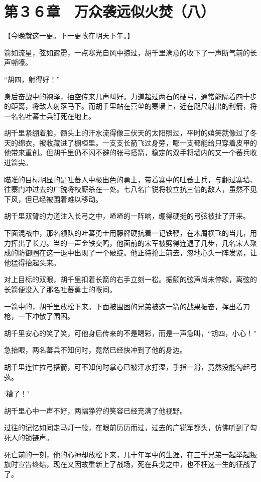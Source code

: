 \section{第３６章　万众袭远似火焚（八）}

【今晚就这一更。下一更改在明天下午。】

箭如流星，弦如霹雳，一点寒光自风中掠过，胡千里满意的收下了一声断气前的长声嘶嚎。

“胡四，射得好！”

身后奋战中的袍泽，抽空传来几声叫好。力道超过两石的硬弓，通常能隔着四十步的距离，将敌人射落马下。而胡千里站在营垒的寨墙上，近在咫尺射出的利箭，将一名名吐蕃士兵钉死在地上。

胡千里紧绷着脸，额头上的汗水流得像三伏天的太阳照过，平时的嬉笑就像过了冬天的绵衣，被收藏进了橱柜里。一支支长箭飞过身旁，哪一支都能给只穿着皮甲的他带来重创。但胡千里仍不闪不避的张弓搭箭，稳定的双手将墙内的又一个蕃兵收进箭尖。

瞄准的目标明显的是吐蕃人中极出色的勇士，带着寨中的吐蕃士兵，与翻过寨墙、往寨门冲过去的广锐将校厮杀在一处。七八名广锐将校立抗三倍的敌人，虽然不见下风，但已经被围着难以移动。

胡千里双臂的力道注入长弓之中，喳喳的一阵响，绷得硬挺的弓弦被扯了开来。

下面混战中，那名领队的吐蕃勇士用藤牌硬抗着一记铁鞭，在木屑横飞的当儿，用力挥出了长刀。当的一声金铁交鸣，他面前的宋军被劈得连退了几步，几名宋人聚成的防御圈在这一退中出现了一个破绽。他正待抢上前去，忽地心头一阵发紧，让他猛得抬起头来。

对上目标的双眼，胡千里扣着长箭的右手立刻一松。振颤的弦声尚未停歇，离弦的长箭便没入了那名吐蕃勇士的喉间。

一箭中的，胡千里放松下来。下面被围困的兄弟被这一箭的战果振奋，挥出着刀枪，一下冲散了围困。

胡千里安心的笑了笑，可他身后传来的不是喝彩，而是一声急叫，“胡四，小心！”

急抬眼，两名蕃兵不知何时，竟然已经快冲到了他的身边。

胡千里连忙拉弓搭箭，可不知何时掌心已被汗水打湿，手指一滑，竟然没能勾起弓弦。

‘糟了！’

胡千里心中一声不好，两幅狰狞的笑容已经充满了他视野。

过往的记忆如同走马灯一般，在眼前历历而过，过去的广锐军都头，仿佛听到了勾死人的锁链声。

死亡前的一刻，他的心神却放松下来，几十年军中的生涯，在三千兄弟一起举起叛旗时宣告终结，现在又因故重新上了战场，死在兵戈之中，也不枉这一生的征战了了。

